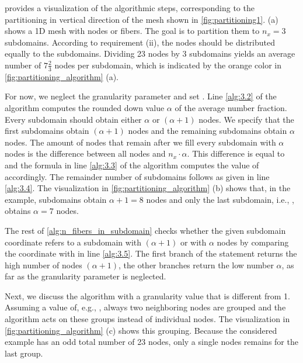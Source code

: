  provides a visualization of the algorithmic steps, corresponding to the partitioning in vertical direction of the mesh shown in \cref{fig:partitioning1}.  (a) shows a 1D mesh with  nodes or fibers.
The goal is to partition them to $n_x=3$ subdomains. According to requirement (ii), the nodes should be distributed equally to the subdomains. Dividing 23 nodes by 3 subdomains yields an average number of $7\frac23$ nodes per subdomain, which is indicated by the orange color in \cref{fig:partitioning_algorithm} (a). 

For now, we neglect the granularity parameter and set . 
Line \ref{alg:3.2} of the algorithm computes the rounded down value $\alpha$ of the average number fraction. Every subdomain should obtain either $\alpha$ or $(\alpha+1)$ nodes. We specify that the first  subdomains obtain $(\alpha+1)$ nodes and the remaining subdomains obtain $\alpha$ nodes. 
The amount of nodes that remain after we fill every subdomain with $\alpha$ nodes is the difference between all nodes  and  $n_x \cdot \alpha$. This difference is equal to  and the formula in line \ref{alg:3.3} of the algorithm computes the value of  accordingly. The remainder number of subdomains  follows as given in line \ref{alg:3.4}.
The visualization in \cref{fig:partitioning_algorithm} (b) shows that, in the example,  subdomains obtain $\alpha+1=8$ nodes and only the last subdomain, i.e., , obtains $\alpha=7$ nodes.

The rest of \cref{alg:n_fibers_in_subdomain} checks whether the given subdomain coordinate  refers to a subdomain with $(\alpha+1)$ or with $\alpha$ nodes by comparing the coordinate with  in line \ref{alg:3.5}. The first branch of the  statement returns the high number of nodes $(\alpha+1)$, the other branches return the low number $\alpha$, as far as the granularity parameter is neglected.

Next, we discuss the algorithm with a granularity value that is different from 1. 
Assuming a value of, e.g., , always two neighboring nodes are grouped and the algorithm acts on these groups instead of individual nodes. The visualization in \cref{fig:partitioning_algorithm} (c) shows this grouping. Because the considered example has an odd total number of 23 nodes, only a single nodes remains for the last group.

